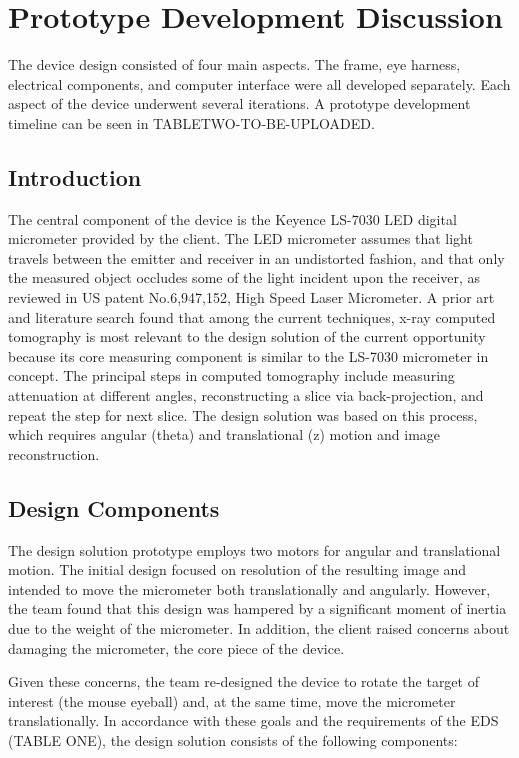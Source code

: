 \documentclass{article}
\begin{document}
\section{Prototype Development Discussion}
\label{sec:prot-devel-disc}
 
The device design consisted of four main aspects. The frame, eye harness, electrical components, and computer interface were all developed separately. Each aspect of the device underwent several iterations. A prototype development timeline can be seen in TABLETWO-TO-BE-UPLOADED.

\subsection{Introduction}
\label{sec:prior-art}
	The central component of the device is the Keyence LS-7030 LED digital micrometer provided by 
the client. The LED micrometer assumes that light travels between the emitter and receiver in an 
undistorted fashion, and that only the measured object occludes some of the light incident upon the 
receiver, as reviewed in US patent No.6,947,152, High Speed Laser Micrometer.  A prior art and literature search found that among the current techniques, x-ray computed tomography is most relevant to the design solution of the current opportunity because its core measuring component is similar to the LS-7030 micrometer in concept. The principal steps in computed tomography 
include measuring attenuation at different angles, reconstructing a slice via back-projection, and repeat the step for next slice. The design solution was based on this process, which requires angular (theta) and 
translational (z) motion and image reconstruction. 

\subsection{Design Components}
\label{sec:prototype-comp}
	The design solution prototype employs two motors for angular and translational motion. The initial design focused on resolution of the resulting image and intended to move the micrometer both translationally and angularly. However, the team found that this design was hampered by a significant moment of inertia due to the weight of the micrometer. In addition, the client raised concerns about damaging the micrometer, the core piece of the device. 

Given these concerns, the team re-designed the device to rotate the target of interest (the mouse eyeball) and, at the same time, move the micrometer translationally. In accordance with these goals and the requirements of the EDS (TABLE ONE), the design solution consists of the following components: 
\end{document}
